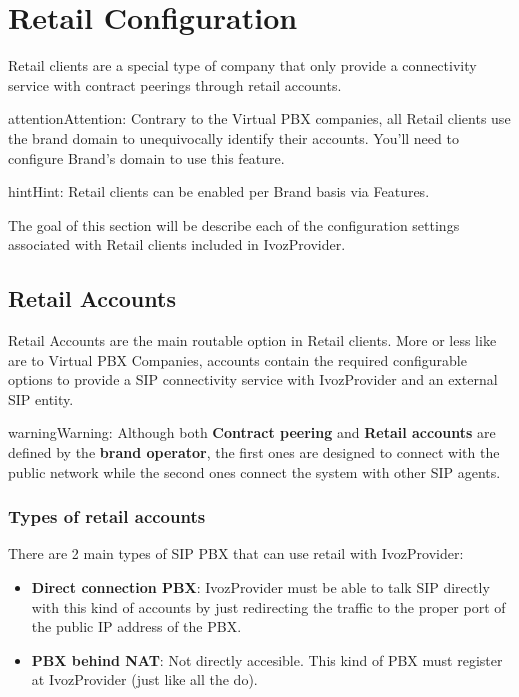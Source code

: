 \documentclass[letterpaper,10pt,english]{sphinxmanual}
\begin{document}
\chapter{Retail Configuration}
\label{retail/index:retail-configuration}\label{retail/index::doc}
Retail clients are a special type of company that only provide a connectivity
service with contract peerings through retail accounts.

\begin{notice}{attention}{Attention:}
Contrary to the Virtual PBX companies, all Retail clients use the
brand domain to unequivocally identify their accounts. You'll need to configure
Brand's domain to use this feature.
\end{notice}

\begin{notice}{hint}{Hint:}
Retail clients can be enabled per Brand basis via Features.
\end{notice}

The goal of this section will be describe each of the configuration settings
associated with Retail clients included in IvozProvider.


\section{Retail Accounts}
\label{retail/accounts::doc}\label{retail/accounts:retail-accounts}\label{retail/accounts:id1}
Retail Accounts are the main routable option in Retail clients.
More or less like {\hyperref[company/friends:friends]{}} are to Virtual PBX Companies, accounts
contain the required configurable options to provide a SIP connectivity
service with IvozProvider and an external SIP entity.

\begin{notice}{warning}{Warning:}
Although both \textbf{Contract peering} and \textbf{Retail accounts} are defined by the
\textbf{brand operator}, the first ones are designed to connect with the public network
while the second ones connect the system with other SIP agents.
\end{notice}


\subsection{Types of retail accounts}
\label{retail/accounts:types-of-retail-accounts}
There are 2 main types of SIP PBX that can use retail with IvozProvider:
\begin{itemize}
\item {} 
\textbf{Direct connection PBX}: IvozProvider must be able to talk SIP directly with
this kind of accounts by just redirecting the traffic to the proper port of
the public IP address of the PBX.

\item {} 
\textbf{PBX behind NAT}: Not directly accesible. This kind of PBX must register at
IvozProvider (just like all the {\hyperref[company/terminals:terminals]{}} do).

\end{itemize}
\end{document}
